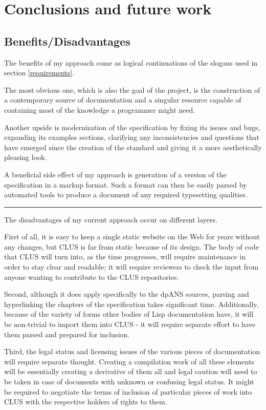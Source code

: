 \section{Conclusions and future work}

\subsection{Benefits/Disadvantages}

The benefits of my approach come as logical continuations of the slogans used in section \ref{requirements}.

The most obvious one, which is also the goal of the project, is the construction of a contemporary source of \cl{} documentation and a singular resource capable of containing most of the knowledge a \cl{} programmer might need.

Another upside is modernization of the specification by fixing its issues and bugs, expanding its examples sections, clarifying any inconsistencies and questions that have emerged since the creation of the standard and giving it a more aesthetically pleasing look.

A beneficial side effect of my approach is generation of a version of the \cl{} specification in a markup format. Such a format can then be easily parsed by automated tools to produce a document of any required typesetting qualities.

\rule{\linewidth}{0.5pt}

The disadvantages of my current approach occur on different layers.

First of all, it is easy to keep a single static website on the Web for years without any changes, but CLUS is far from static because of its design. The body of code that CLUS will turn into, as the time progresses, will require maintenance in order to stay clear and readable; it will require reviewers to check the input from anyone wanting to contribute to the CLUS repositories.

Second, although it does apply specifically to the dpANS sources, parsing and hyperlinking the chapters of the specification takes significant time. Additionally, because of the variety of forms other bodies of Lisp documentation have, it will be non-trivial to import them into CLUS - it will require separate effort to have them parsed and prepared for inclusion.

Third, the legal status and licensing issues of the various pieces of documentation will require separate thought. Creating a compilation work of all these elements will be essentially creating a derivative of them all and legal caution will need to be taken in case of documents with unknown or confusing legal status. It might be required to negotiate the terms of inclusion of particular pieces of work into CLUS with the respective holders of rights to them.

